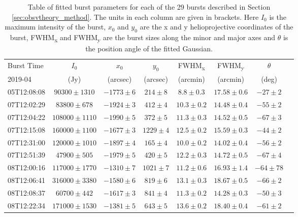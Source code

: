 \begin{table}
\centering
\caption[Table of fitted burst parameters]{Table of fitted burst parameters for each of the 29 bursts described in Section \ref{sec:obsvtheory_method}. The units in each column are given in brackets. Here $I_0$ is the maximum intensity of the burst, $x_0$ and $y_0$ are the x and y helioprojective coordinates of the burst, FWHM\textsubscript{x} and FWHM\textsubscript{y} are the burst sizes along the minor and major axes and $\theta$ is the position angle of the fitted Gaussian.}
\label{tab:dataset}
\begin{tabular}{lcccccc p{\columnwidth}}
\toprule
Burst Time & $I_0$  & $x_0$ & $y_0$  & FWHM\textsubscript{x} & FWHM\textsubscript{y} & $\theta$ \\
 2019-04 & (Jy) & (arcsec) & (arcsec) & (arcmin) & (arcmin) &  (deg) \\
\midrule
05T12:08:08 &  $ 90300 \pm 1310$ & $-1773 \pm 6$  & $  214 \pm 8$  &  $  8.8 \pm 0.3$ &  $ 17.58 \pm 0.6$ & $ -27 \pm 2$ \\
07T12:02:29 &  $ 83800 \pm  678$ & $-1924 \pm 3$  & $  412 \pm 4$  &  $ 10.3 \pm 0.2$ &  $ 14.48 \pm 0.4$ & $ -55 \pm 2$ \\
07T12:04:22 &  $108000 \pm 1110$ & $-1990 \pm 5$  & $  372 \pm 5$  &  $ 11.3 \pm 0.3$ &  $ 14.52 \pm 0.5$ & $ -67 \pm 3$ \\
07T12:15:08 &  $160000 \pm 1100$ & $-1677 \pm 3$  & $ 1229 \pm 4$  &  $ 12.5 \pm 0.2$ &  $ 15.59 \pm 0.3$ & $ -44 \pm 2$ \\
07T12:31:00 &  $120000 \pm 1010$ & $-1897 \pm 4$  & $  165 \pm 4$  &  $ 10.0 \pm 0.2$ &  $ 14.02 \pm 0.4$ & $ -56 \pm 2$ \\
07T12:51:39 &  $ 47900 \pm  505$ & $-1979 \pm 5$  & $  420 \pm 5$  &  $ 12.2 \pm 0.3$ &  $ 14.72 \pm 0.5$ & $ -67 \pm 4$ \\
08T12:00:16 &  $117000 \pm 1770$ & $-1310 \pm 7$  & $ 1021 \pm 7$  &  $ 11.2 \pm 0.6$ &  $ 16.93 \pm 1.4$ & $ -64 \pm 78$ \\
08T12:06:41 &  $316000 \pm 3380$ & $-1580 \pm 6$  & $  819 \pm 6$  &  $ 13.1 \pm 0.3$ &  $ 18.67 \pm 0.5$ & $ -66 \pm 2$ \\
08T12:08:37 &  $ 60700 \pm  442$ & $-1617 \pm 3$  & $  841 \pm 4$  &  $ 11.3 \pm 0.2$ &  $ 14.28 \pm 0.3$ & $ -50 \pm 3$ \\
08T12:22:34 &  $171000 \pm 1530$ & $-1381 \pm 5$  & $  643 \pm 5$  &  $ 13.6 \pm 0.2$ &  $ 18.40 \pm 0.4$ & $ -61 \pm 2$ \\

\end{tabular}
\end{table}
